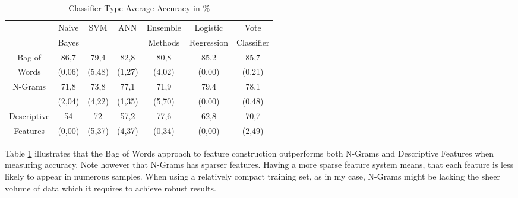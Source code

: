 			\par
			
			\begin{table}[H]
				\centering
				\begin{tabular}{c|cccccc}
					\hline\hline\vspace*{-2mm}
											 & Naive & \multirow{2}{*}{SVM} & \multirow{2}{*}{ANN} & Ensemble & Logistic 	 & Vote \\
											 & Bayes & 					 	&       			   & Methods  & Regression 	 & Classifier \\
					\hline
					Bag of					 & 86,7   & 79,4   & 82,8   & 80,8 	 & 85,2   & 85,7  \\
					Words					 & (0,06) & (5,48) & (1,27) & (4,02) & (0,00) & (0,21) \\
					\hline
					\multirow{2}{*}{N-Grams} & 71,8   & 73,8   & 77,1 	& 71,9 	 & 79,4   & 78,1 \\
											 & (2,04) & (4,22) & (1,35) & (5,70) & (0,00) & (0,48)\\	
					\hline
					Descriptive				 & 54 	  & 72 	   & 57,2   & 77,6   & 62,8   &  70,7\\
					Features 				 & (0,00) & (5,37) & (4,37) & (0,34) & (0,00) & (2,49)\\	
					\hline\hline				
				\end{tabular}
				\captionsetup{width=0.8\textwidth}
				\caption{Classifier Type Average Accuracy in \%}
				\label{tab:accuracy}%
			\end{table}%
		
		Table \ref{tab:accuracy} illustrates that the Bag of Words approach to feature construction outperforms both N-Grams and Descriptive Features when measuring accuracy. Note however that N-Grams has sparser features. Having a more sparse feature system means, that each feature is less likely to appear in numerous samples. When using a relatively compact training set, as in my case, N-Grams might be lacking the sheer volume of data which it requires to achieve robust results.
		
